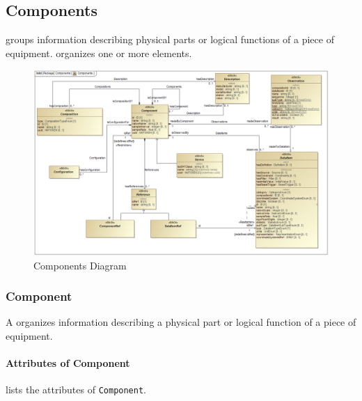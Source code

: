 \subsection{Components} \label{sec:Components}


 groups information describing physical parts or logical functions of a piece of equipment.    \glspl{organize} one or more  elements. 

\begin{figure}[ht]
  \centering
    \includegraphics[width=1.0\textwidth]{figures/Components.png}
  \caption{Components Diagram}
  \label{fig:Components}
\end{figure}

\FloatBarrier



\subsubsection{Component}
\label{sec:Component}



A  organizes information describing a physical part or logical function of a piece of equipment.


\paragraph{Attributes of Component}\mbox{}
\label{sec:Attributes of Component}

 lists the attributes of \texttt{Component}.

